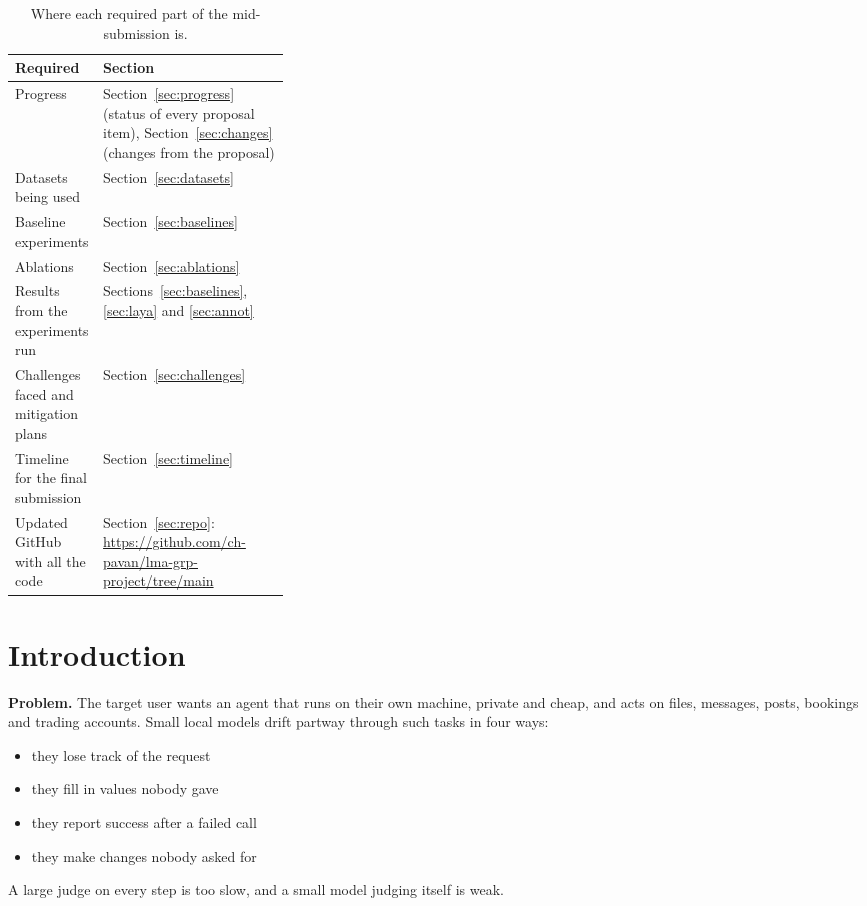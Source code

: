 \documentclass[10.5pt,a4paper]{article}
\newcommand{\tablestyle}{\small\rowcolors{2}{rowshade}{white}}
\begin{document}
{\small\tableofcontents}
\vspace{2pt}{\color{rule}\rule{\linewidth}{0.4pt}}

\begin{table}[H]
\centering\tablestyle
\caption{Where each required part of the mid-submission is.}\label{tab:required}
\begin{tabularx}{\linewidth}{P{0.32\linewidth}Y}
\toprule
{}\textbf{Required} & \textbf{Section} \\
\midrule
Progress & Section~\ref{sec:progress} (status of every proposal item), Section~\ref{sec:changes} (changes from the proposal) \\
Datasets being used & Section~\ref{sec:datasets} \\
Baseline experiments & Section~\ref{sec:baselines} \\
Ablations & Section~\ref{sec:ablations} \\
Results from the experiments run & Sections~\ref{sec:baselines}, \ref{sec:laya} and \ref{sec:annot} \\
Challenges faced and mitigation plans & Section~\ref{sec:challenges} \\
Timeline for the final submission & Section~\ref{sec:timeline} \\
Updated GitHub with all the code & Section~\ref{sec:repo}: \url{https://github.com/ch-pavan/lma-grp-project/tree/main} \\
\bottomrule
\end{tabularx}
\end{table}

\section{Introduction}

\textbf{Problem.} The target user wants an agent that runs on their own machine, private and cheap, and acts on files, messages, posts, bookings and trading accounts. Small local models drift partway through such tasks in four ways:
\begin{itemize}
  \item they lose track of the request
  \item they fill in values nobody gave
  \item they report success after a failed call
  \item they make changes nobody asked for
\end{itemize}
A large judge on every step is too slow, and a small model judging itself is weak.
\end{document}
